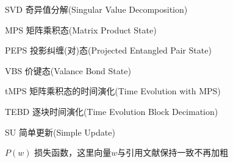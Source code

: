 
\begin{notation}

  \begin{notationlist}{2em}
  	\item[SVD]		奇异值分解(Singular Value Decomposition)
	\item[MPS]		矩阵乘积态(Matrix Product State)
	\item[PEPS]		投影纠缠(对)态(Projected Entangled Pair State)
	\item[VBS]		价键态(Valance Bond State)
	\item[tMPS]		矩阵乘积态的时间演化(Time Evolution with MPS)
	\item[TEBD]		逐块时间演化(Time Evolution Block Decimation)
	\item[SU]		简单更新(Simple Update)
    \item[$P(w)$]	损失函数，这里向量$w$与引用文献保持一致不再加粗
  \end{notationlist}

\end{notation}





